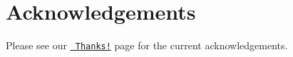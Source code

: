 \chapter{Acknowledgements}
\hypertarget{md__c_1_2_users_2namph_2_downloads_2openssl_2openssl-3_82_81_2_a_c_k_n_o_w_l_e_d_g_e_m_e_n_t_s}{}\label{md__c_1_2_users_2namph_2_downloads_2openssl_2openssl-3_82_81_2_a_c_k_n_o_w_l_e_d_g_e_m_e_n_t_s}
Please see our \href{https://www.openssl.org/community/thanks.html}{\texttt{ Thanks!}} page for the current acknowledgements. 